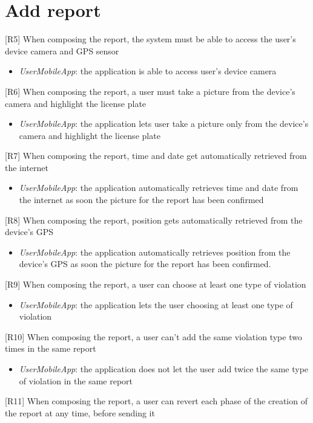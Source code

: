 		\section{Add report}
			{[R5]} When composing the report, the system must be able to access the user's device camera and GPS sensor
					\begin{itemize}
						\item \textit{UserMobileApp}: the application is able to access user's device camera
					\end{itemize}
			{[R6]} When composing the report, a user must take a picture from the device's camera and highlight the license plate
					\begin{itemize}
						\item \textit{UserMobileApp}: the application lets user take a picture only from the device's camera and highlight the license plate
					\end{itemize}
			{[R7]} When composing the report, time and date get automatically retrieved from the internet
					\begin{itemize}
						\item \textit{UserMobileApp}:  the application automatically retrieves time and date from the internet as soon the picture for the report has been confirmed
					\end{itemize}
			{[R8]} When composing the report, position gets automatically retrieved from the device's GPS
					\begin{itemize}
						\item \textit{UserMobileApp}: the application automatically retrieves position from the device's GPS as soon the picture for the report has been confirmed.
					\end{itemize}
			{[R9]} When composing the report, a user can choose at least one type of violation
					\begin{itemize}
						\item \textit{UserMobileApp}: the application lets the user choosing at least one type of violation
					\end{itemize}
			{[R10]} When composing the report, a user can't add the same violation type two times in the same report
					\begin{itemize}
						\item \textit{UserMobileApp}: the application does not let the user add twice the same type of violation in the same report
					\end{itemize}
			{[R11]} When composing the report, a user can revert each phase of the creation of the report at any time, before sending it

